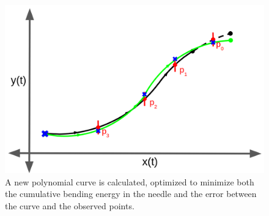 \begin{figure}[h]
\includegraphics[width=1.0\textwidth]{Fig/chap3/curvefit_pt3.png}
\caption{A new polynomial curve is calculated, optimized to minimize both the cumulative bending energy in the needle and the error between the curve and the observed points.}
\label{fig:curve_fit_pt3}
\end{figure}

